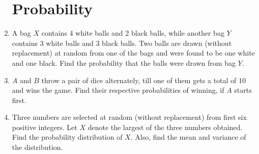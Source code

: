 \documentclass[12pt,-letter paper]{article}
\begin{document}
\begin{enumerate}
\section{Probability}
	\item A bag $X$ contains 4 white balls and 2 black balls, while another bag $Y$ contains
3 white balls and 3 black balls. Two balls are drawn (without replacement) at
random from one of the bags and were found to be one white and one black.
Find the probability that the balls were drawn from bag $Y$.

	\item $A$ and $B$ throw a pair of dice alternately, till one of them gets a total of 10 and
wins the game. Find their respective probabilities of winning, if $A$ starts first.

	\item Three numbers are selected at random (without replacement) from first six
positive integers. Let $X$ denote the largest of the three numbers obtained. Find
the probability distribution of $X$. Also, find the mean and variance of the
distribution.

	

\end{enumerate}
\end{document}
